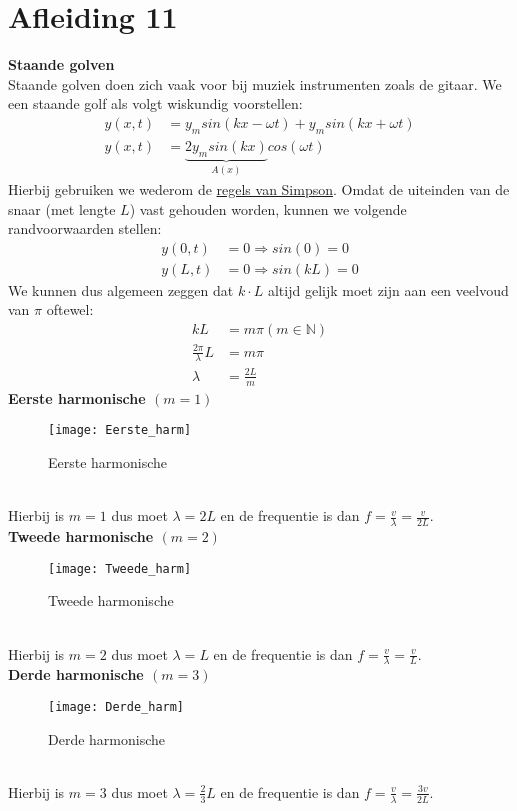 \documentclass[a4paper,kul]{kulakarticle} %
\begin{document}
\section{Afleiding 11}
\textbf{Staande golven}\\
Staande golven doen zich vaak voor bij muziek instrumenten zoals de gitaar. We een staande golf als volgt wiskundig voorstellen:
\begin{align*}
	y(x,t) &=y_msin(kx-\omega t)+y_msin(kx+\omega t)\\
	y(x,t) &=\underbrace{2y_msin(kx)}_{A(x)}cos(\omega t)
\end{align*}
Hierbij gebruiken we wederom de \href{https://nl.wikipedia.org/wiki/Lijst_van_goniometrische_gelijkheden#Som-naar-product-identiteiten_(regels_van_Simpson)}{regels van Simpson}. Omdat de uiteinden van de snaar (met lengte $L$) vast gehouden worden, kunnen we volgende randvoorwaarden stellen:
\begin{align*}
	y(0,t)  &= 0 \Rightarrow sin(0)=0\\
	y(L,t) &= 0 \Rightarrow sin(kL)=0
\end{align*}
We kunnen dus algemeen zeggen dat $k\cdot L$ altijd gelijk moet zijn aan een veelvoud van $\pi$ oftewel:
\begin{align*}
	kL & = m\pi (m\in\mathbb{N})\\
	\frac{2\pi}{\lambda}L &=m\pi\\
	\lambda & = \frac{2L}{m}
\end{align*}
\textbf{Eerste harmonische $(m = 1)$}\\
\begin{figure}[h]
	\centering
	\texttt{[image: Eerste\_harm]}
	\caption[Eerste harmonische]{Eerste harmonische}
	\label{fig:eersteharm}
\end{figure}\\
Hierbij is $m = 1$ dus moet $\lambda = 2L$ en de frequentie is dan $f = \frac{v}{\lambda} = \frac{v}{2L}$.\\
\newpage
\textbf{Tweede harmonische $(m = 2)$}\\
\begin{figure}[h]
	\centering
	\texttt{[image: Tweede\_harm]}
	\caption[Tweede harmonische]{Tweede harmonische}
	\label{fig:tweedeharm}
\end{figure}\\
Hierbij is $m = 2$ dus moet $\lambda = L$ en de frequentie is dan $f = \frac{v}{\lambda} = \frac{v}{L}$.\\
\textbf{Derde harmonische $(m = 3)$}\\
\begin{figure}[h]
	\centering
	\texttt{[image: Derde\_harm]}
	\caption[Derde harmonische]{Derde harmonische}
	\label{fig:Derdeharm}
\end{figure}\\
Hierbij is $m = 3$ dus moet $\lambda = \frac{2}{3}L$ en de frequentie is dan $f = \frac{v}{\lambda} = \frac{3v}{2L}$.\\
\newpage
\end{document}
